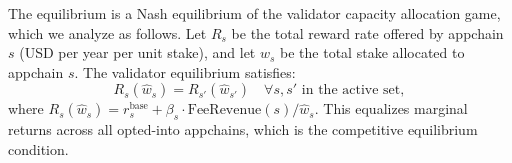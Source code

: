 The equilibrium is a Nash equilibrium of the validator capacity allocation game, which
we analyze as follows. Let $R_s$ be the total reward rate offered by appchain $s$ (USD per
year per unit stake), and let $\hat{w}_s$ be the total stake allocated to appchain $s$.
The validator equilibrium satisfies:
\[
  R_s(\hat{w}_s) = R_{s'}(\hat{w}_{s'}) \quad \forall s, s' \text{ in the active set},
\]
where $R_s(\hat{w}_s) = r_s^{\text{base}} + \beta_s \cdot \text{FeeRevenue}(s) / \hat{w}_s$.
This equalizes marginal returns across all opted-into appchains, which is the competitive
equilibrium condition.

